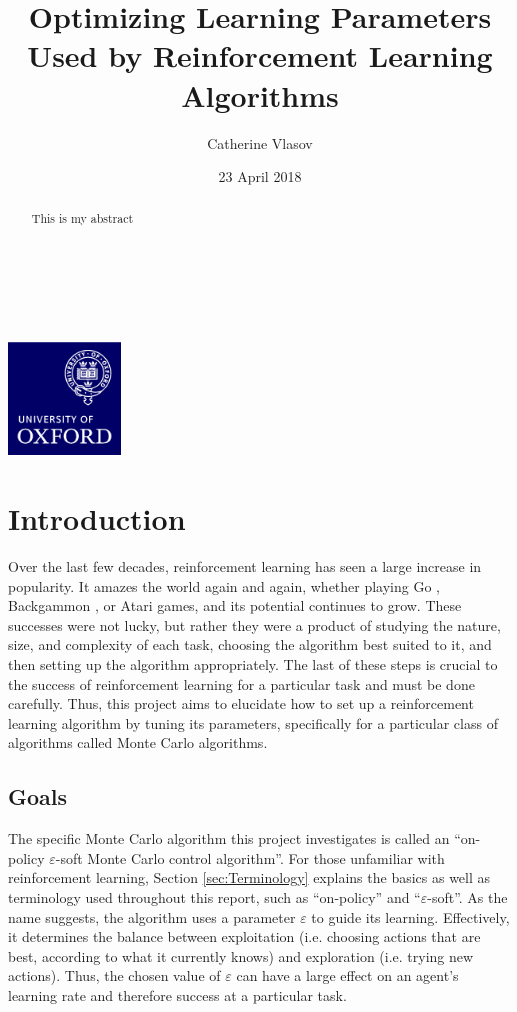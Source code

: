 \documentclass[11pt,a4paper]{report}
\author{Catherine Vlasov}
\title{Optimizing Learning Parameters Used by Reinforcement Learning Algorithms}
\date{23 April 2018}
\begin{document}
\makeatletter
	\begin{titlepage}
		\vspace*{\fill}
		\begin{center}
			{\huge \bfseries \@title }
			\\[4ex]
			{\LARGE  \@author}
			\\[2ex]
			{\large \@date}
			\\[50ex]
			\includegraphics[width=30mm]{oxlogo.png}
		\end{center}
		\vspace*{\fill}
	\end{titlepage}
\makeatother


\begin{abstract}
This is my abstract
\end{abstract}


\tableofcontents


\chapter{Introduction}

Over the last few decades, reinforcement learning has seen a large increase in popularity. It amazes the world again and again, whether playing Go \cite{go}, Backgammon \cite{backgammon}, or Atari \cite{atari} games, and its potential continues to grow. These successes were not lucky, but rather they were a product of studying the nature, size, and complexity of each task, choosing the algorithm best suited to it, and then setting up the algorithm appropriately. The last of these steps is crucial to the success of reinforcement learning for a particular task and must be done carefully. Thus, this project aims to elucidate how to set up a reinforcement learning algorithm by tuning its parameters, specifically for a particular class of algorithms called Monte Carlo algorithms.


\section{Goals}

The specific Monte Carlo algorithm this project investigates is called an ``on-policy $\varepsilon$-soft Monte Carlo control algorithm''. For those unfamiliar with reinforcement learning, Section \ref{sec:Terminology} explains the basics as well as terminology used throughout this report, such as ``on-policy'' and ``$\varepsilon$-soft''. As the name suggests, the algorithm uses a parameter $\varepsilon$ to guide its learning. Effectively, it determines the balance between exploitation (i.e. choosing actions that are best, according to what it currently knows) and exploration (i.e. trying new actions). Thus, the chosen value of $\varepsilon$ can have a large effect on an agent's learning rate and therefore success at a particular task.
\end{document}
